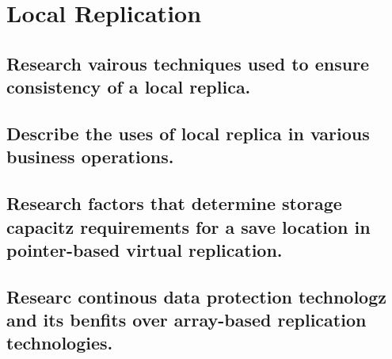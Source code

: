\section{Local Replication} %
\label{sec:local_replication}

\subsection{Research vairous techniques used to ensure consistency of a local replica.} %
\label{sub:research_vairous_techniques_used_to_ensure_consistency_of_a_local_replica}


\subsection{Describe the uses of local replica in various business operations.} %
\label{sub:describe_the_uses_of_local_replica_in_various_business_operations}


\subsection{Research factors that determine storage capacitz requirements for a save location in pointer-based virtual replication.} %
\label{sub:research_factors_that_determine_storage_capacitz_requirements_for_a_save_location_in_pointer_based_virtual_replication}


\subsection{Researc continous data protection technologz and its benfits over array-based replication technologies.} %
\label{sub:researc_continous_data_protection_technologz_and_its_benfits_over_array_based_replication_technologies}


